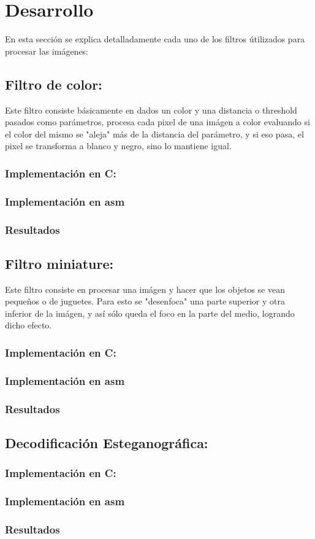 \section{Desarrollo}

En esta secci\'on se explica detalladamente cada uno de los filtros \'utilizados para procesar las im\'agenes:

\subsection{Filtro de color:}

Este filtro consiste b\'asicamente en dados un color y una distancia o threshold pasados como par\'ametros, procesa cada pixel de una im\'agen a color evaluando si el color del mismo se "aleja" m\'as de la distancia del par\'ametro, y si eso pasa, el pixel se transforma a blanco y negro, sino lo mantiene igual.
\subsubsection{Implementaci\'on en C:}
\subsubsection{Implementaci\'on en asm}
\subsubsection{Resultados}

\subsection{Filtro miniature:}

Este filtro consiste en procesar una im\'agen y hacer que los objetos se vean pequeños o de juguetes. Para esto se "desenfoca" una parte superior y otra inferior de la im\'agen, y as\'i s\'olo queda el foco en la parte del medio, logrando dicho efecto.
\subsubsection{Implementaci\'on en C:}
\subsubsection{Implementaci\'on en asm}
\subsubsection{Resultados}

\subsection{Decodificaci\'on Esteganogr\'afica:}

\subsubsection{Implementaci\'on en C:}
\subsubsection{Implementaci\'on en asm}
\subsubsection{Resultados}
